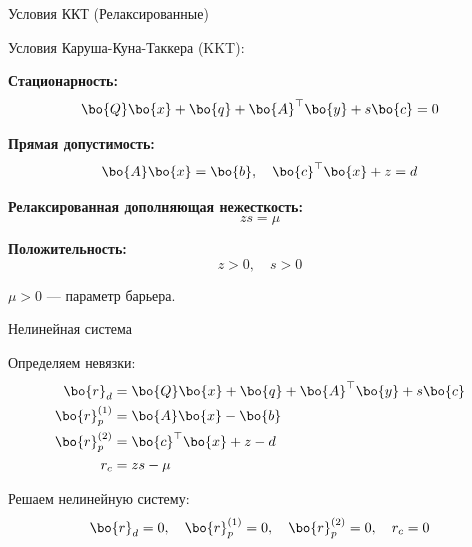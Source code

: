 \documentclass{beamer}
\begin{document}
\begin{frame}{Условия ККТ (Релаксированные)}
	\begin{flushleft}
		
		Условия Каруша-Куна-Таккера (KKT):
		
		\vspace{0.5em}
		
		\textbf{Стационарность:}
		\[
		\bo{Q}\bo{x} + \bo{q} + \bo{A}^\top \bo{y} + s \bo{c} = 0
		\]
		
		\textbf{Прямая допустимость:}
		\[
		\bo{A}\bo{x} = \bo{b}, \quad \bo{c}^\top \bo{x} + z = d
		\]
		
		\textbf{Релаксированная дополняющая нежесткость:}
		\[
		z s = \mu
		\]
		
		\textbf{Положительность:}
		\[
		z > 0, \quad s > 0
		\]
		
		\vspace{0.5em}
		
		$\mu > 0$ — параметр барьера.
		
	\end{flushleft}
\end{frame}

\begin{frame}{Нелинейная система}
	\begin{flushleft}
		
		Определяем невязки:
		\begin{align*}
			\bo{r}_d &= \bo{Q}\bo{x} + \bo{q} + \bo{A}^\top \bo{y} + s \bo{c} \\
			\bo{r}_p^{(1)} &= \bo{A}\bo{x} - \bo{b} \\
			\bo{r}_p^{(2)} &= \bo{c}^\top \bo{x} + z - d \\
			r_c &= z s - \mu
		\end{align*}
		
		\vspace{0.5em}
		
		Решаем нелинейную систему:
		\[
		\bo{r}_d = 0, \quad \bo{r}_p^{(1)} = 0, \quad \bo{r}_p^{(2)} = 0, \quad r_c = 0
		\]
		
	\end{flushleft}
\end{frame}
\end{document}
